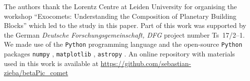 \documentclass{aa}
\begin{document}
\begin{acknowledgements}

      The authors thank the Lorentz Centre at Leiden University for organising the workshop ``Exocomets: Understanding the Composition of Planetary Building Blocks'' which led to the study in this paper. 
%
      Part of this work was supported by the German
      \emph{Deut\-sche For\-schungs\-ge\-mein\-schaft, DFG\/} project
      number Ts~17/2--1.
We made use of the {\tt Python} programming language \citep{rossum1995} and the open-source {\tt Python} packages {\tt numpy} \citep{walt2011}, {\tt matplotlib} \citep{hunter2007}, {\tt astropy} \citep{astropy2013}.
%      
An online repository with materials used in this work is available at \url{https://github.com/sebastian-zieba/betaPic_comet}
\end{acknowledgements}











   
  


\end{document}
